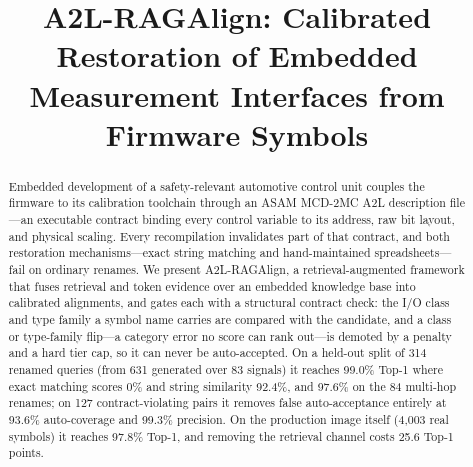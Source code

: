 \documentclass[conference]{IEEEtran}
\newcommand{\toolname}{A2L-RAGAlign}
\begin{document}
\title{\toolname{}: Calibrated Restoration of Embedded Measurement
Interfaces from Firmware Symbols}

\author{
\and
{}
}

\maketitle

\begin{abstract}
Embedded development of a safety-relevant automotive control unit couples the
firmware to its calibration toolchain through an ASAM MCD-2MC A2L
description file---an executable contract binding every control variable to
its address, raw bit layout, and physical scaling. Every recompilation
invalidates part of that contract, and both restoration
mechanisms---exact string matching and hand-maintained spreadsheets---fail on
ordinary renames. We present \toolname{}, a retrieval-augmented
framework that fuses retrieval and token evidence over an embedded knowledge
base into calibrated alignments, and gates each with a structural contract
check: the I/O class and type family a symbol name carries are compared with
the candidate, and a class or type-family flip---a category error no score can
rank out---is demoted by a penalty and a hard tier cap, so it can never be
auto-accepted. On a held-out split of 314 renamed queries (from 631 generated
over 83 signals) it reaches 99.0\% Top-1 where exact matching scores 0\% and
string similarity 92.4\%, and 97.6\% on the 84 multi-hop renames; on 127
contract-violating pairs it removes false auto-acceptance entirely at 93.6\%
auto-coverage and 99.3\% precision. On the production image itself
(4{,}003 real symbols) it reaches 97.8\% Top-1, and removing the retrieval
channel costs 25.6 Top-1 points.
\end{abstract}
\end{document}
